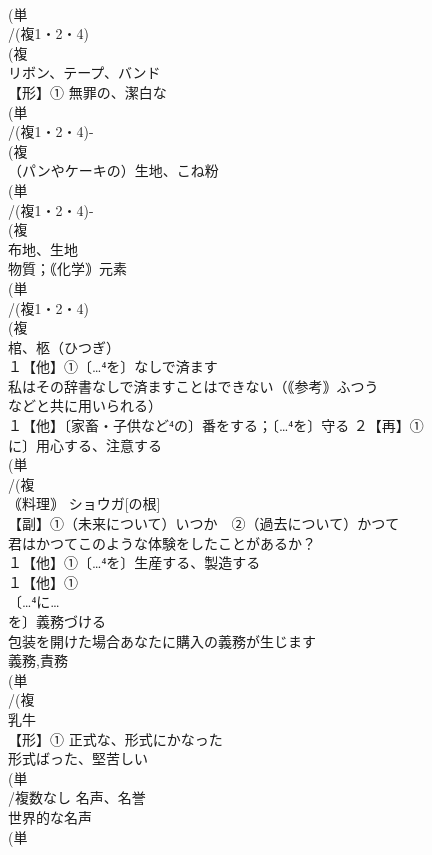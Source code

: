 \documentclass[8pt]{extreport}
\begin{document}
\begin{CJK}{UTF8}{min}
\\	(単
\\	/(複1・2・4)
\\	(複
\\	リボン、テープ、バンド 
\\	【形】① 無罪の、潔白な 
\\	(単
\\	/(複1・2・4)-
\\	(複
\\	（パンやケーキの）生地、こね粉 
\\	(単
\\	/(複1・2・4)-
\\	(複
\\	布地、生地　
\\	物質；｟化学｠元素 
\\	(単
\\	/(複1・2・4)
\\	(複
\\	棺、柩（ひつぎ）
\\	１【他】①〔…⁴を〕なしで済ます 
\\	私はその辞書なしで済ますことはできない（｟参考｠ふつう
\\	などと共に用いられる）
\\	１【他】〔家畜・子供など⁴の〕番をする；〔…⁴を〕守る ２【再】①
\\	に〕用心する、注意する
\\	(単
\\	/(複
\\	｟料理｠ ショウガ[の根] 
\\	【副】①（未来について）いつか　②（過去について）かつて 
\\	君はかつてこのような体験をしたことがあるか？
\\	１【他】①〔…⁴を〕生産する、製造する 
\\	１【他】①
\\	〔…⁴に…
\\	を〕義務づける 
\\	包装を開けた場合あなたに購入の義務が生じます 
\\	義務,責務
\\	(単
\\	/(複
\\	乳牛 
\\	【形】① 正式な、形式にかなった　
\\	形式ばった、堅苦しい
\\	(単
\\	/複数なし 名声、名誉 
\\	世界的な名声
\\	(単

\end{CJK}
\end{document}
